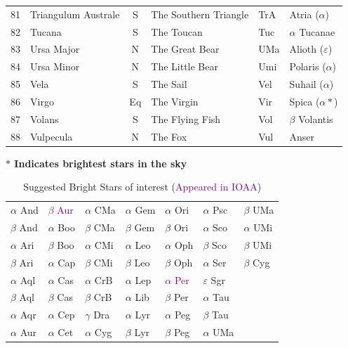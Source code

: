 \documentclass[a4paper,12pt]{extarticle}
\newcommand{\prt}[1]{\textcolor{purple}{#1}}
\begin{document}
\begin{table}[H]
\begin{tabular}{llclll}
81                         & Triangulum Australe                  & S                               & The Southern Triangle                  & TrA                         & Atria ($\alpha$)  \\
82 & Tucana     & S  & The Toucan      & Tuc & $\alpha$ Tucanae       \\
83 & Ursa Major & N  & The Great Bear  & UMa & Alioth ($\varepsilon$) \\
84 & Ursa Minor & N  & The Little Bear & Umi & Polaris ($\alpha$)     \\
85 & Vela       & S  & The Sail        & Vel & Suhail ($\alpha$)      \\
86 & Virgo      & Eq & The Virgin      & Vir & Spica ($\alpha \ast$)  \\
87 & Volans     & S  & The Flying Fish & Vol & $\beta$ Volantis       \\
88 & Vulpecula  & N  & The Fox         & Vul & Anser 
\end{tabular}
\end{table}

\textbf{$\ast$ Indicates brightest stars in the sky}

\begin{table}[H]
\centering
\begin{tabular}{lllllll}
$\alpha$ And                & \prt{$\beta$ Aur}  & $\alpha$ CMa  & $\alpha$ Gem & $\alpha$ Ori & $\alpha$ Psc      & $\beta$ UMa   \\
$\beta$ And                 & $\alpha$ Boo & $\beta$ CMa   & $\beta$ Gem  & $\beta$ Ori  & $\alpha$ Sco      & $\alpha$ UMi \\
$\alpha$ Ari                & $\beta$ Boo  & $\alpha$ CMi  & $\alpha$ Leo & $\alpha$ Oph & $\beta$ Sco       & $\beta$ UMi  \\
$\beta$ Ari                 & $\alpha$ Cap & $\beta$ CMi   & $\beta$ Leo  & $\beta$ Oph  & $\alpha$ Ser      & $\beta$ Cyg  \\
$\alpha$ Aql                & $\alpha$ Cas & $\alpha$ CrB  & $\alpha$ Lep & \prt{$\alpha$ Per} & $\varepsilon$ Sgr &              \\
$\beta$ Aql                 & $\beta$ Cas  & $\beta$ CrB   & $\alpha$ Lib & $\beta$ Per  & $\alpha$ Tau      &              \\
$\alpha$ Aqr                & $\alpha$ Cep & $\gamma$  Dra & $\alpha$ Lyr & $\alpha$ Peg & $\beta$ Tau       &              \\
$\alpha$ Aur & $\alpha$ Cet & $\alpha$ Cyg  & $\beta$ Lyr  & $\beta$ Peg  & $\alpha$ UMa      &             
\end{tabular}
\caption{Suggested Bright Stars of interest (\prt{Appeared in IOAA})}
\end{table}
\end{document}
